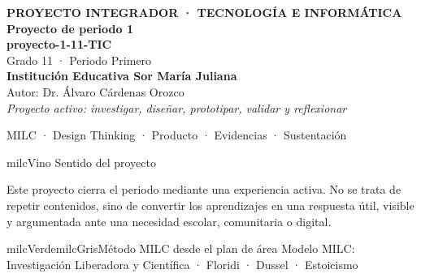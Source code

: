 \documentclass[11pt,letterpaper]{article}
\begin{document}
\thispagestyle{empty}

\vspace*{.85cm}
\begin{tcolorbox}[
  enhanced,colback=milcVino,colframe=milcVino,arc=12mm,width=.86\textwidth,
  boxrule=0pt,left=12mm,right=12mm,top=11mm,bottom=11mm,center,
  overlay={\draw[milcMagenta,line width=2pt,dash pattern=on 9pt off 8pt,rounded corners=10mm]
  ([xshift=7mm,yshift=-7mm]frame.north west) rectangle ([xshift=-7mm,yshift=7mm]frame.south east);}]
  \centering
  {\sffamily\bfseries\color{white}\fontsize{15}{17}\selectfont PROYECTO INTEGRADOR · TECNOLOGÍA E INFORMÁTICA}\\[1.0cm]
  {\sffamily\bfseries\color{white}\fontsize{30}{33}\selectfont Proyecto de periodo 1}\\[3mm]
  {\sffamily\bfseries\color{milcMostaza}\fontsize{25}{28}\selectfont proyecto-1-11-TIC}\\[8mm]
  {\sffamily\color{white}\Large Grado 11 · Periodo Primero}\\[1.0cm]
  {\sffamily\bfseries\color{white}\large Institución Educativa Sor María Juliana}\\[2mm]
  {\sffamily\color{white}Autor: Dr. Álvaro Cárdenas Orozco}\\[4mm]
  {\sffamily\itshape\color{white}Proyecto activo: investigar, diseñar, prototipar, validar y reflexionar}
\end{tcolorbox}
\vfill
\begin{tcolorbox}[enhanced,colback=milcVino!72!black,colframe=milcVino!72!black,arc=5mm,boxrule=0pt,width=.86\textwidth,left=6mm,right=6mm,top=4mm,bottom=4mm,center]
{\color{white}\sffamily\small MILC · Design Thinking · Producto · Evidencias · Sustentación}
\end{tcolorbox}

\newpage
\begin{titlebox}{milcVino}
Sentido del proyecto
\end{titlebox}
\begin{multicols}{2}
Este proyecto cierra el periodo mediante una experiencia activa. No se trata de repetir contenidos, sino de convertir los aprendizajes en una respuesta útil, visible y argumentada ante una necesidad escolar, comunitaria o digital.

\columnbreak
\begin{softbox}{milcVerde}{milcGris}{Método MILC desde el plan de área}
Modelo MILC: Investigación Liberadora y Científica · Floridi · Dussel · Estoicismo
\end{softbox}
\end{multicols}
\end{document}
